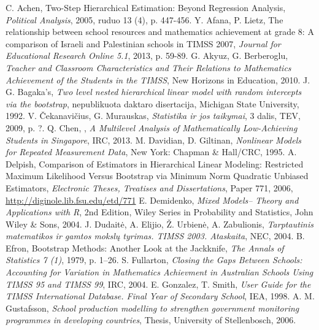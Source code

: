 \documentclass[11pt,a4paper]{article}
\begin{document}
\newpage
\renewcommand\refname{LITERATŪRA IR ŠALTINIAI}
\begin{thebibliography}{1}
 C. Achen, Two-Step Hierarchical Estimation: Beyond Regression Analysis,  \textit{Political Analysis}, 2005, ruduo 13 (4), p. 447-456.
 Y. Afana,  P. Lietz, The relationship between school resources and mathematics achievement at grade 8: A comparison of Israeli and Palestinian schools in TIMSS 2007, \textit{Journal for Educational Research Online 5.1}, 2013, p. 59-89.
 G. Akyuz, G. Berberoglu, \textit{Teacher and Classroom Characteristics and Their Relations to Mathematics Achievement of the Students in the TIMSS}, New Horizons in Education, 2010.
J. G. Bagaka's, \textit{Two level nested hierarchical linear model with random intercepts via the bootstrap}, nepublikuota daktaro disertacija, Michigan State University, 1992.
 V. Čekanavičius, G. Murauskas, \textit{Statistika ir jos taikymai}, 3 dalis, TEV, 2009, p. ?.
 Q. Chen, , \textit{A Multilevel Analysis of Mathematically Low-Achieving Students in Singapore}, IRC, 2013.
M. Davidian, D. Giltinan, \textit{Nonlinear Models for Repeated Measurement Data}, New York: Chapman \& Hall/CRC, 1995.
 A. Delpish, Comparison of Estimators in Hierarchical Linear Modeling: Restricted Maximum Likelihood Versus Bootstrap via Minimum Norm Quadratic Unbiased Estimators, \textit{Electronic Theses, Treatises and Dissertations}, Paper 771, 2006, \href{http://diginole.lib.fsu.edu/etd/771}{http://diginole.lib.fsu.edu/etd/771}
 E. Demidenko, \textit{Mixed Models– Theory and Applications with R}, 2nd Edition, Wiley Series in Probability and Statistics, John Wiley \& Sons, 2004.
 J. Dudaitė, A. Elijio, Ž. Urbienė, A. Zabulionis, \textit{Tarptautinis matematikos ir gamtos mokslų tyrimas. TIMSS 2003. Ataskaita}, NEC, 2004.
 B. Efron, Bootstrap Methods: Another Look at the Jackknife, \textit{The Annals of Statistics 7 (1)}, 1979, p. 1–26.
 S. Fullarton, \textit{Closing the Gaps Between Schools: Accounting for Variation in Mathematics Achievment in Australian Schools Using TIMSS 95 and TIMSS 99}, IRC, 2004.
 E. Gonzalez, T. Smith, \textit{User Guide for the TIMSS International Database. Final Year of Secondary School}, IEA, 1998.
 A. M. Gustafsson, \textit{School production modelling to strengthen government monitoring programmes in developing countries}, Thesis, University of Stellenbosch, 2006.

\end{thebibliography}
\end{document}
